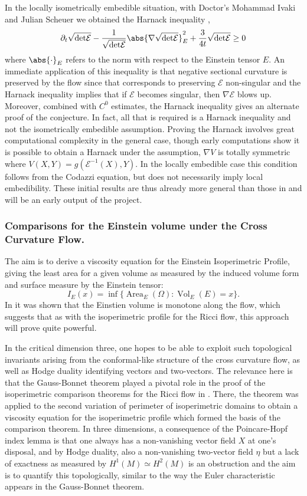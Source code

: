 \documentclass[12pt]{amsart}
\begin{document}
In the locally isometrically embedible situation, with Doctor's Mohammad Ivaki and Julian Scheuer we obtained the Harnack inequality \cite{BIS4},
\[
\partial_t \sqrt{{\det} \mathcal{E}} - \frac{1}{\sqrt{{\det}\mathcal{E}}} \abs{\nabla \sqrt{{\det}\mathcal{E}}}_E^2  + \frac{3}{4 t} \sqrt{{\det}\mathcal{E}} \geq 0
\]
where $\abs{\cdot}_E$ refers to the norm with respect to the Einstein tensor $E$. An immediate application of this inequality is that negative sectional curvature is preserved by the flow since that corresponds to preserving $\mathcal{E}$ non-singular and the Harnack inequality implies that if $\mathcal{E}$ becomes singular, then $\nabla \mathcal{E}$ blows up. Moreover, combined with $C^0$ estimates, the Harnack inequality gives an alternate proof of the conjecture. In fact, all that is required is a Harnack inequality and not the isometrically embedible assumption. Proving the Harnack involves great computational complexity in the general case, though early computations show it is possible to obtain a Harnack under the assumption, $\nabla V$ is totally symmetric where $V (X, Y) = g(\mathcal{E}^{-1}(X), Y)$. In the locally embedible case this condition follows from the Codazzi equation, but does not necessarily imply local embedibility. These initial results are thus already more general than those in \cite{MR3344442} and will be an early output of the project.

\subsubsection*{Comparisons for the Einstein volume under the Cross Curvature Flow.}
\label{sec-3-4-2}



The aim is to derive a viscosity equation for the Einstein Isoperimetric Profile, giving the least area for a given volume as measured by the induced volume form and surface measure by the Einstein tensor:
\[
I_E (x) = \inf\{\operatorname{Area}_E (\Omega) : \operatorname{Vol}_E (E) = x\}.
\]
In \cite{MR2055396} it was shown that the Einstien volume is monotone along the flow, which suggests that as with the isoperimetric profile for the Ricci flow, this approach will prove quite powerful.

In the critical dimension three, one hopes to be able to exploit such topological invariants arising from the conformal-like structure of the cross curvature flow, as well as Hodge duality identifying vectors and two-vectors. The relevance here is that the Gauss-Bonnet theorem played a pivotal role in the proof of the isoperimetric comparison theorems for the Ricci flow in \cite{Bryan,MR2729306}. There, the theorem was applied to the second variation of perimeter of isoperimetric domains to obtain a viscosity equation for the isoperimetric profile which formed the basis of the comparison theorem. In three dimensions, a consequence of the Poincare-Hopf index lemma is that one always has a non-vanishing vector field $X$ at one's disposal, and by Hodge duality, also a non-vanishing two-vector field $\eta$ but a lack of exactness as measured by $H^1(M) \simeq H^2(M)$ is an obstruction and the aim is to quantify this topologically, similar to the way the Euler characteristic appears in the Gauss-Bonnet theorem.
\end{document}
